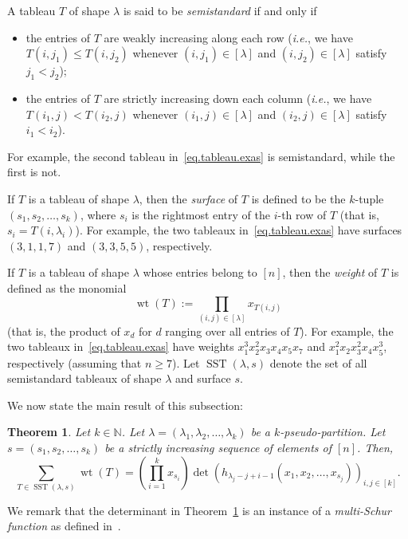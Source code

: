 \documentclass[reqno]{amsart}
\newcommand{\0}{\phantom{c}}
\newcommand{\diag}[1]{\left[#1\right]} %
\DeclareMathOperator{\wt}{wt} %
\DeclareMathOperator{\SST}{SST} %
\newcommand{\NN}{\mathbb{N}}
\let\sumnonlimits\sum
\let\prodnonlimits\prod
\renewcommand{\sum}{\sumnonlimits\limits}
\renewcommand{\prod}{\prodnonlimits\limits}
\newcommand{\tup}[1]{\left( #1 \right)}
\newcommand{\ive}[1]{\left[ #1 \right]}
\newcommand{\defn}[1]{{\color{darkred}\emph{#1}}} %
\theoremstyle{plain}
\newtheorem{thm}{Theorem}[section]
\theoremstyle{definition}
\numberwithin{equation}{section}
\begin{document}
A tableau $T$ of shape $\lambda$ is said to be \defn{semistandard} if and only if

\begin{itemize}
\item the entries of $T$ are weakly increasing along each row (\textit{i.e.}, we have $T(i,j_1) \leq T(  i,j_2)$ whenever $(i,j_1)  \in \diag{\lambda}$ and $(i,j_2) \in \diag{\lambda}$ satisfy $j_1 < j_2$);

\item the entries of $T$ are strictly increasing down each column (\textit{i.e.}, we have $T(i_1,j) < T(i_2,j)$ whenever $(i_1,j) \in \diag{\lambda}$ and $(i_2,j) \in \diag{\lambda}$ satisfy $i_1 < i_2$).
\end{itemize}

For example, the second tableau in~\eqref{eq.tableau.exas} is semistandard, while the first is not.

If $T$ is a tableau of shape $\lambda$, then the \defn{surface} of $T$ is defined to be the $k$-tuple $(s_1, s_2, \dotsc, s_k)$, where $s_i$ is the rightmost entry of the $i$-th row of $T$ (that is, $s_i = T(i,\lambda_i)$). For example, the two tableaux in~\eqref{eq.tableau.exas} have surfaces $(3,1,1,7)$ and $(3,3,5,5)$, respectively.

If $T$ is a tableau of shape $\lambda$ whose entries belong to $\ive{n}$, then the \defn{weight} of $T$ is defined as the monomial
\[
\wt(T) := \prod_{(i,j) \in \diag{\lambda}} x_{T(i,j)}
\]
(that is, the product of $x_{d}$ for $d$ ranging over all entries of $T$).
For example, the two tableaux in~\eqref{eq.tableau.exas} have weights $x_1^{3}x_2^{2}x_{3}x_{4}x_{5}x_{7}$ and $x_1^{2}x_2x_{3}^{2}x_{4}x_{5}^{3}$, respectively (assuming that $n \geq 7$).
Let $\SST(\lambda, s)$ denote the set of all semistandard tableaux of shape $\lambda$ and surface $s$.

We now state the main result of this subsection:

\begin{thm}
\label{thm.tableau.jt}
Let $k \in \NN$.
Let $\lambda = \tup{\lambda_1, \lambda_2, \dotsc, \lambda_k}$ be a $k$-pseudo-partition.
Let $s = \tup{s_1, s_2, \dotsc, s_k}$ be a strictly increasing sequence of elements of $\ive{n}$.
Then,
\[
\sum_{T \in \SST(\lambda, s)} \wt(T) = \left(  \prod_{i=1}^{k} x_{s_i} \right)  \det\left(  h_{\lambda_j-j+i-1}(  x_1,x_2,\ldots,x_{s_j})  \right)_{i, j \in \ive{k}} .
\]
\end{thm}

We remark that the determinant in Theorem~\ref{thm.tableau.jt} is an instance of a \defn{multi-Schur function} as defined in~\cite[(SCHUR.2.2)]{LLPT18}.
\end{document}
